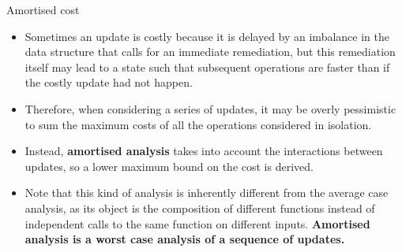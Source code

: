 %
\begin{frame}{Amortised cost}

  \begin{itemize}

    \item Sometimes an update is costly because it is delayed by an
      imbalance in the data structure that calls for an immediate
      remediation, but this remediation itself may lead to a state
      such that subsequent operations are faster than if the costly
      update had not happen.

    \item Therefore, when considering a series of updates, it may be
      overly pessimistic to sum the maximum costs of all the
      operations considered in isolation.

    \item Instead, \textbf{amortised analysis} takes into account the
      interactions between updates, so a lower maximum bound on the
      cost is derived.

    \item Note that this kind of analysis is inherently different from
      the average case analysis, as its object is the composition of
      different functions instead of independent calls to the same
      function on different inputs. \textbf{Amortised analysis is a
        worst case analysis of a sequence of updates.}

  \end{itemize}

\end{frame}
